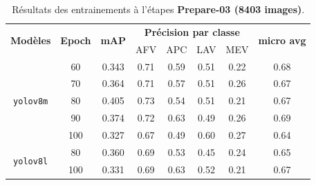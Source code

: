 \begin{table}[H]
	\centering
	\begin{tabular}{|c|c|c|c|c|c|c|c|}
		\hline
		\multirow{2}{*}{\textbf{Modèles}} & \multirow{2}{*}{\textbf{Epoch}} & \multirow{2}{*}{\textbf{mAP}} & \multicolumn{4}{c|}{\textbf{Précision par classe}} & \multirow{2}{*}{\textbf{micro avg}}                      \\ \cline{4-7}

		                                  &                                 &                               & AFV                                                & APC                                 & LAV  & MEV  &      \\ \hline
		\multirow{5}{*}{\texttt{yolov8m}}
		                                  & 60                              & 0.343                         & 0.71                                               & 0.59                                & 0.51 & 0.22 & 0.68 \\ \cline{2-8}
		                                  & 70                              & 0.364                         & 0.71                                               & 0.57                                & 0.51 & 0.26 & 0.67 \\ \cline{2-8}
		                                  & 80                              & 0.405                         & 0.73                                               & 0.54                                & 0.51 & 0.21 & 0.67 \\ \cline{2-8}
		                                  & 90                              & 0.374                         & 0.72                                               & 0.63                                & 0.49 & 0.26 & 0.69 \\ \cline{2-8}
		                                  & 100                             & 0.327                         & 0.67                                               & 0.49                                & 0.60 & 0.27 & 0.64 \\ \hline
		\multirow{2}{*}{\texttt{yolov8l}}
		                                  & 80                              & 0.360                         & 0.69                                               & 0.53                                & 0.45 & 0.24 & 0.65 \\ \cline{2-8}
		                                  & 100                             & 0.331                         & 0.69                                               & 0.63                                & 0.52 & 0.21 & 0.67 \\ \hline
	\end{tabular}
	\caption{Résultats des entrainements à l'étapes \textbf{Prepare-03 (8403 images)}.}
	\label{tab:results}
\end{table}

